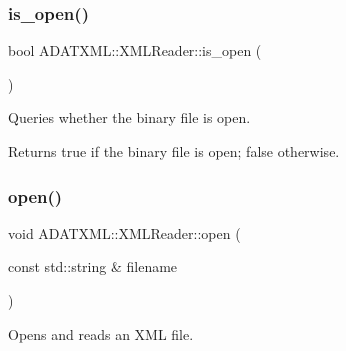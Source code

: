 \subsubsection{\texorpdfstring{is\_open()}{is\_open()}\hspace{0.1cm}{\footnotesize\ttfamily [3/3]}}
{\footnotesize\ttfamily bool A\+D\+A\+T\+X\+M\+L\+::\+X\+M\+L\+Reader\+::is\+\_\+open (\begin{DoxyParamCaption}{ }\end{DoxyParamCaption})\hspace{0.3cm}{\ttfamily [inline]}}



Queries whether the binary file is open. 

\begin{DoxyReturn}{Returns}
true if the binary file is open; false otherwise. 
\end{DoxyReturn}
\mbox{\label{classADATXML_1_1XMLReader_ad5dcbd08800bc67ac4a91f93cb1504b0}} 
\subsubsection{\texorpdfstring{open()}{open()}\hspace{0.1cm}{\footnotesize\ttfamily [1/9]}}
{\footnotesize\ttfamily void A\+D\+A\+T\+X\+M\+L\+::\+X\+M\+L\+Reader\+::open (\begin{DoxyParamCaption}\item[{const std\+::string \&}]{filename }\end{DoxyParamCaption})\hspace{0.3cm}{\ttfamily [inline]}}



Opens and reads an X\+ML file. 


